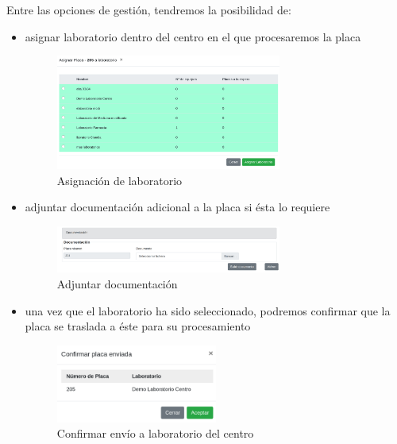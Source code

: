 \documentclass[a4paper,spanish]{paper}
\begin{document}
Entre las opciones de gestión, tendremos la posibilidad de:

\begin{itemize}
    \item asignar laboratorio dentro del centro en el que procesaremos la placa
    
\begin{figure}[h]
\centering
\includegraphics[width=0.7\textwidth]{Figs/Fig20.png}
\caption{Asignación de laboratorio}
\label{Fig20}
\end{figure}

    \item adjuntar documentación adicional a la placa si ésta lo requiere

\begin{figure}[h]
\centering
\includegraphics[width=0.7\textwidth]{Figs/Fig22.png}
\caption{Adjuntar documentación}
\label{Fig22}
\end{figure}

    \item una vez que el laboratorio ha sido seleccionado, podremos confirmar que la placa se traslada a éste para su procesamiento

\begin{figure}[h]
\centering
\includegraphics[width=0.5\textwidth]{Figs/Fig21.png}
\caption{Confirmar envío a laboratorio del centro}
\label{Fig21}
\end{figure}
    
\end{itemize}
\end{document}
